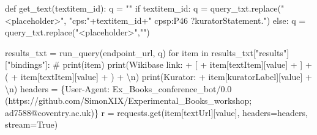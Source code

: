 \documentclass[
  a4paper,
]{book}
\newenvironment{Shaded}{\begin{snugshade}}{\end{snugshade}}
\newcommand{\BuiltInTok}[1]{\textcolor[rgb]{0.00,0.23,0.31}{#1}}
\newcommand{\CharTok}[1]{\textcolor[rgb]{0.13,0.47,0.30}{#1}}
\newcommand{\CommentTok}[1]{\textcolor[rgb]{0.37,0.37,0.37}{#1}}
\newcommand{\ControlFlowTok}[1]{\textcolor[rgb]{0.00,0.23,0.31}{#1}}
\newcommand{\KeywordTok}[1]{\textcolor[rgb]{0.00,0.23,0.31}{#1}}
\newcommand{\NormalTok}[1]{\textcolor[rgb]{0.00,0.23,0.31}{#1}}
\newcommand{\OperatorTok}[1]{\textcolor[rgb]{0.37,0.37,0.37}{#1}}
\newcommand{\StringTok}[1]{\textcolor[rgb]{0.13,0.47,0.30}{#1}}
\newcommand{\VariableTok}[1]{\textcolor[rgb]{0.07,0.07,0.07}{#1}}
\begin{document}
\begin{Shaded}
\begin{Highlighting}[]
\KeywordTok{def}\NormalTok{ get\_text(textitem\_id):}
\NormalTok{    q }\OperatorTok{=} \StringTok{""}
    \ControlFlowTok{if}\NormalTok{ textitem\_id:}
\NormalTok{        q }\OperatorTok{=}\NormalTok{ query\_txt.replace(}\StringTok{"\textless{}placeholder\textgreater{}"}\NormalTok{, }\StringTok{"cps:"}\OperatorTok{+}\NormalTok{textitem\_id}\OperatorTok{+}\StringTok{" cpsp:P46 ?kuratorStatement."}\NormalTok{)}
    \ControlFlowTok{else}\NormalTok{:}
\NormalTok{        q }\OperatorTok{=}\NormalTok{ query\_txt.replace(}\StringTok{"\textless{}placeholder\textgreater{}"}\NormalTok{,}\StringTok{""}\NormalTok{)}

\NormalTok{    results\_txt }\OperatorTok{=}\NormalTok{ run\_query(endpoint\_url, q)}
    \ControlFlowTok{for}\NormalTok{ item }\KeywordTok{in}\NormalTok{ results\_txt[}\StringTok{"results"}\NormalTok{][}\StringTok{"bindings"}\NormalTok{]:}
        \CommentTok{\# print(item)}
        \BuiltInTok{print}\NormalTok{(}\StringTok{\textquotesingle{}Wikibase link: \textquotesingle{}} \OperatorTok{+} \StringTok{\textquotesingle{}[\textquotesingle{}} \OperatorTok{+}\NormalTok{ item[}\StringTok{\textquotesingle{}textItem\textquotesingle{}}\NormalTok{][}\StringTok{\textquotesingle{}value\textquotesingle{}}\NormalTok{] }\OperatorTok{+} \StringTok{\textquotesingle{}]\textquotesingle{}} \OperatorTok{+} \StringTok{\textquotesingle{}(\textquotesingle{}} \OperatorTok{+}\NormalTok{ item[}\StringTok{\textquotesingle{}textItem\textquotesingle{}}\NormalTok{][}\StringTok{\textquotesingle{}value\textquotesingle{}}\NormalTok{] }\OperatorTok{+} \StringTok{\textquotesingle{})\textquotesingle{}} \OperatorTok{+} \StringTok{\textquotesingle{}}\CharTok{\textbackslash{}n}\StringTok{\textquotesingle{}}\NormalTok{)}
        \BuiltInTok{print}\NormalTok{(}\StringTok{\textquotesingle{}Kurator: \textquotesingle{}} \OperatorTok{+}\NormalTok{ item[}\StringTok{\textquotesingle{}kuratorLabel\textquotesingle{}}\NormalTok{][}\StringTok{\textquotesingle{}value\textquotesingle{}}\NormalTok{] }\OperatorTok{+} \StringTok{\textquotesingle{}}\CharTok{\textbackslash{}n}\StringTok{\textquotesingle{}}\NormalTok{)}
\NormalTok{        headers }\OperatorTok{=}\NormalTok{ \{}\StringTok{\textquotesingle{}User{-}Agent\textquotesingle{}}\NormalTok{: }\StringTok{\textquotesingle{}Ex\_Books\_conference\_bot/0.0 (https://github.com/SimonXIX/Experimental\_Books\_workshop; ad7588@coventry.ac.uk)\textquotesingle{}}\NormalTok{\}}
\NormalTok{        r }\OperatorTok{=}\NormalTok{ requests.get(item[}\StringTok{\textquotesingle{}textUrl\textquotesingle{}}\NormalTok{][}\StringTok{\textquotesingle{}value\textquotesingle{}}\NormalTok{], headers}\OperatorTok{=}\NormalTok{headers, stream}\OperatorTok{=}\VariableTok{True}\NormalTok{)}

\end{Highlighting}
\end{Shaded}
\end{document}
